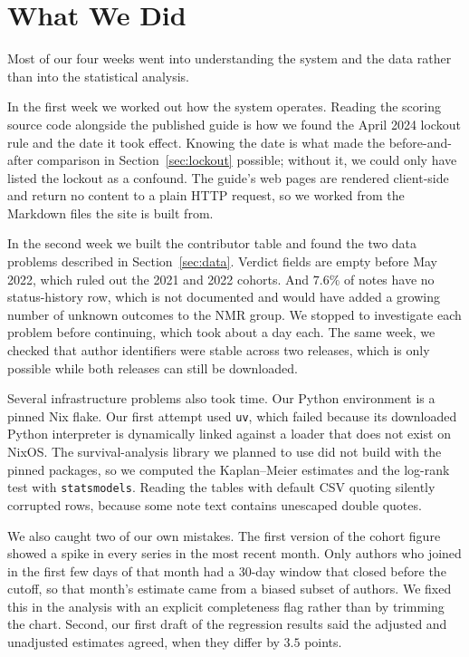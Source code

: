 \documentclass[sigconf,nonacm]{acmart}
\begin{document}




\appendix

\section{What We Did}

Most of our four weeks went into understanding the system and the data rather than into
the statistical analysis.

In the first week we worked out how the system operates. Reading the scoring source code
alongside the published guide is how we found the April 2024 lockout rule and the date it
took effect. Knowing the date is what made the before-and-after comparison in
Section~\ref{sec:lockout} possible; without it, we could only have listed the lockout as a
confound. The guide's web pages are rendered client-side and return no content to a plain
HTTP request, so we worked from the Markdown files the site is built from.

In the second week we built the contributor table and found the two data problems described
in Section~\ref{sec:data}. Verdict fields are empty before May 2022, which ruled out the
2021 and 2022 cohorts. And $7.6\%$ of notes have no status-history row, which is not
documented and would have added a growing number of unknown outcomes to the NMR group. We
stopped to investigate each problem before continuing, which took about a day each. The
same week, we checked that author identifiers were stable across two releases, which is
only possible while both releases can still be downloaded.

Several infrastructure problems also took time. Our Python environment is a pinned Nix
flake. Our first attempt used \texttt{uv}, which failed because its downloaded Python
interpreter is dynamically linked against a loader that does not exist on NixOS. The
survival-analysis library we planned to use did not build with the pinned packages, so we
computed the Kaplan--Meier estimates and the log-rank test with \texttt{statsmodels}.
Reading the tables with default CSV quoting silently corrupted rows, because some note text
contains unescaped double quotes.

We also caught two of our own mistakes. The first version of the cohort figure showed a
spike in every series in the most recent month. Only authors who joined in the first few
days of that month had a 30-day window that closed before the cutoff, so that month's
estimate came from a biased subset of authors. We fixed this in the analysis with an
explicit completeness flag rather than by trimming the chart. Second, our first draft of
the regression results said the adjusted and unadjusted estimates agreed, when they differ
by $3.5$ points.
\end{document}
